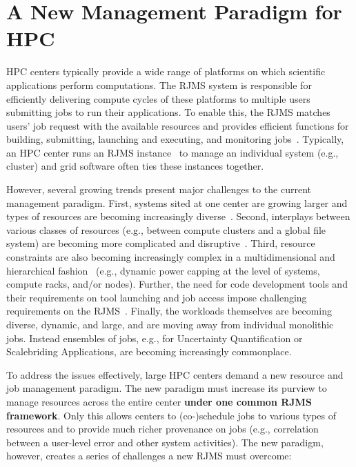 \section{A New Management Paradigm for HPC}
\label{label:paradigm}
HPC centers typically provide a wide range of 
platforms on which scientific applications perform
computations.
The RJMS system is responsible for efficiently delivering 
compute cycles of these platforms
to multiple users submitting jobs to run their applications. 
To enable this, the RJMS matches users' job request with the available 
resources and provides efficient functions 
for building, submitting, launching and executing, 
and monitoring jobs~\cite{GeorgiouThesis}. 
Typically, an HPC center runs an RJMS instance~\cite{Jette02slurm} 
to manage an individual system (e.g., cluster) and 
grid software often ties these instances together. 

However, several growing trends present major challenges 
to the current management paradigm. 
First, systems sited at one center are growing larger 
and types of resources are becoming increasingly diverse~\cite{GeorgiouThesis}. 
Second, interplays between 
various classes of resources
(e.g., between compute clusters and a global file system)
are becoming more complicated and disruptive~\cite{SCR,SPINDLE}. 
Third, resource constraints are also becoming increasingly
complex in a multidimensional and hierarchical fashion~\cite{power-overprovision}
(e.g., dynamic power capping at the level of systems, compute racks, and/or nodes).
Further, the need for code development tools and their requirements on tool launching and job access
impose challenging requirements on the RJMS~\cite{STAT,SPINDLE,PRUNER,SCR,launchmon}.
Finally, the workloads themselves are becoming 
diverse, dynamic, and large, and are moving away from individual monolithic jobs. Instead
ensembles of jobs, e.g., for Uncertainty Quantification 
or Scalebriding Applications, are becoming increasingly commonplace.

To address the issues effectively,
large HPC centers demand a new resource and job management paradigm.
The new paradigm must increase its purview
to manage resources across the entire center
{\bf under one common RJMS framework}. Only this allows
centers to (co-)schedule jobs 
to various types of resources and to
provide much richer provenance on jobs (e.g., correlation between
a user-level error and other system activities). The new paradigm, however,
creates a series of challenges a new RJMS must overcome:

